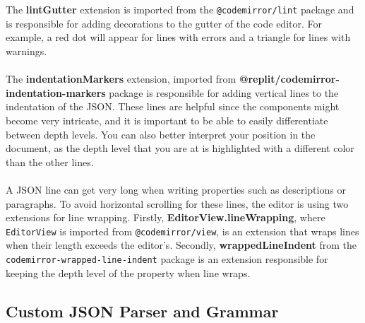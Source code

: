 \\\\
\noindent The \textbf{lintGutter} extension is imported from the \texttt{@codemirror/lint} package and is responsible for adding decorations to the gutter of the code editor. For example, a red dot will appear for lines with errors and a triangle for lines with warnings.
\\\\
\noindent The \textbf{indentationMarkers} extension, imported from \textbf{@replit/codemirror-indentation-markers} package is responsible for adding vertical lines to the indentation of the JSON. These lines are helpful since the components might become very intricate, and it is important to be able to easily differentiate between depth levels. You can also better interpret your position in the document, as the depth level that you are at is highlighted with a different color than the other lines.
\\\\
\noindent A JSON line can get very long when writing properties such as descriptions or paragraphs. To avoid horizontal scrolling for these lines, the editor is using two extensions for line wrapping. Firstly, \textbf{EditorView.lineWrapping}, where \texttt{EditorView} is imported from \texttt{@codemirror/view}, is an extension that wraps lines when their length exceeds the editor's. Secondly, \textbf{wrappedLineIndent} from the \texttt{codemirror-wrapped-line-indent} package is an extension responsible for keeping the depth level of the property when line wraps.

\subsection{Custom JSON Parser and Grammar}

